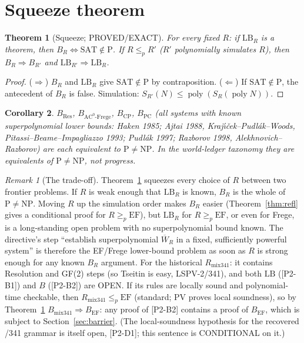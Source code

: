 \documentclass[11pt]{article}
\newtheorem{theorem}{Theorem}
\newtheorem{corollary}[theorem]{Corollary}
\theoremstyle{definition}
\theoremstyle{remark}
\newtheorem*{remark}{Remark}
\newcommand{\Wbar}{\overline W}
\newcommand{\poly}{\operatorname{poly}}
\begin{document}
\section{Squeeze theorem}
\begin{theorem}[Squeeze; PROVED/EXACT]\label{thm:squeeze}
For every fixed $R$: if $\mathrm{LB}_R$ is a theorem, then $B_R\iff\mathrm{SAT}\notin\mathrm P$.
If $R\le_p R'$ ($R'$ polynomially simulates $R$), then $B_R\Rightarrow B_{R'}$ and
$\mathrm{LB}_{R'}\Rightarrow\mathrm{LB}_R$.
\end{theorem}
\begin{proof}
($\Rightarrow$) $B_R$ and $\mathrm{LB}_R$ give $\mathrm{SAT}\notin\mathrm P$ by contraposition.
($\Leftarrow$) If $\mathrm{SAT}\notin\mathrm P$, the antecedent of $B_R$ is false. Simulation:
$S_{R'}(N)\le\poly(S_R(\poly N))$.
\end{proof}
\begin{corollary}
$B_{\mathrm{Res}}$, $B_{\mathrm{AC^0\text{-}Frege}}$, $B_{\mathrm{CP}}$,
$B_{\mathrm{PC}}$ (all systems with known superpolynomial lower bounds:
Haken 1985; Ajtai 1988, Kraj\'{\i}\v{c}ek--Pudl\'ak--Woods, Pitassi--Beame--Impagliazzo 1993;
Pudl\'ak 1997; Razborov 1998, Alekhnovich--Razborov) are each \emph{equivalent} to $\mathrm P\ne\mathrm{NP}$.
In the world-ledger taxonomy they are equivalents of $\mathrm P\ne\mathrm{NP}$, not progress.
\end{corollary}
\begin{remark}[The trade-off]
Theorem~\ref{thm:squeeze} squeezes every choice of $R$ between two frontier problems.
If $R$ is weak enough that $\mathrm{LB}_R$ is known, $B_R$ is the whole of $\mathrm P\ne\mathrm{NP}$.
Moving $R$ up the simulation order makes $B_R$ easier (Theorem~\ref{thm:refl} gives a conditional proof
for $R\ge_p\mathrm{EF}$), but $\mathrm{LB}_R$ for $R\ge_p\mathrm{EF}$, or even for Frege, is a
long-standing open problem with no superpolynomial bound known. The directive's step
``establish superpolynomial $\Wbar_R$ in a fixed, sufficiently powerful system'' is therefore the
EF/Frege lower-bound problem as soon as $R$ is strong enough for any known $B_R$ argument.
For the historical $R_{\mathrm{mix341}}$: it contains Resolution and GF(2) steps (so Tseitin is easy,
LSPV-2/341), and both $\mathrm{LB}$ ([P2-B1]) and $B$ ([P2-B2]) are OPEN. If its rules are locally
sound and polynomial-time checkable, then $R_{\mathrm{mix341}}\le_p\mathrm{EF}$ (standard; PV proves
local soundness), so by Theorem~\ref{thm:squeeze} $B_{\mathrm{mix341}}\Rightarrow B_{\mathrm{EF}}$:
any proof of [P2-B2] contains a proof of $B_{\mathrm{EF}}$, which is subject to
Section~\ref{sec:barrier}. (The local-soundness hypothesis for the recovered /341 grammar is itself
open, [P2-D1]; this sentence is CONDITIONAL on it.)
\end{remark}
\end{document}
